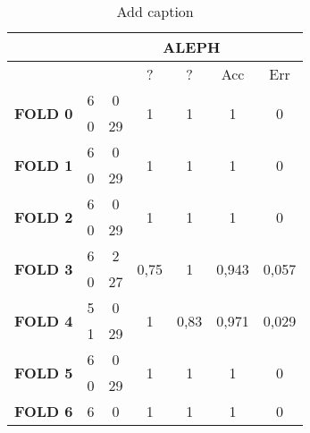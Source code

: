 \begin{table}[htbp]
  \centering
  \caption{Add caption}
    \begin{tabular}{rcccccc}
    \toprule
          & \multicolumn{6}{c}{\textbf{ALEPH}} \\
    \midrule
          &       &       & ?     & ?     & Acc   & Err \\
    \multicolumn{1}{c}{\multirow{2}[2]{*}{\textbf{FOLD 0}}} & 6     & 0     & \multirow{2}[2]{*}{1} & \multirow{2}[2]{*}{1} & \multirow{2}[2]{*}{1} & \multirow{2}[2]{*}{0} \\
    \multicolumn{1}{c}{} & 0     & 29    &       &       &       &  \\
    \multicolumn{1}{c}{\multirow{2}[1]{*}{\textbf{FOLD 1}}} & 6     & 0     & \multirow{2}[1]{*}{1} & \multirow{2}[1]{*}{1} & \multirow{2}[1]{*}{1} & \multirow{2}[1]{*}{0} \\
    \multicolumn{1}{c}{} & 0     & 29    &       &       &       &  \\
    \multicolumn{1}{c}{\multirow{2}[0]{*}{\textbf{FOLD 2}}} & 6     & 0     & \multirow{2}[0]{*}{1} & \multirow{2}[0]{*}{1} & \multirow{2}[0]{*}{1} & \multirow{2}[0]{*}{0} \\
    \multicolumn{1}{c}{} & 0     & 29    &       &       &       &  \\
    \multicolumn{1}{c}{\multirow{2}[1]{*}{\textbf{FOLD 3}}} & 6     & 2     & \multirow{2}[1]{*}{0,75} & \multirow{2}[1]{*}{1} & \multirow{2}[1]{*}{0,943} & \multirow{2}[1]{*}{0,057} \\
    \multicolumn{1}{c}{} & 0     & 27    &       &       &       &  \\
    \multicolumn{1}{c}{\multirow{2}[2]{*}{\textbf{FOLD 4}}} & 5     & 0     & \multirow{2}[2]{*}{1} & \multirow{2}[2]{*}{0,83} & \multirow{2}[2]{*}{0,971} & \multirow{2}[2]{*}{0,029} \\
    \multicolumn{1}{c}{} & 1     & 29    &       &       &       &  \\
    \multicolumn{1}{c}{\multirow{2}[1]{*}{\textbf{FOLD 5}}} & 6     & 0     & \multirow{2}[1]{*}{1} & \multirow{2}[1]{*}{1} & \multirow{2}[1]{*}{1} & \multirow{2}[1]{*}{0} \\
    \multicolumn{1}{c}{} & 0     & 29    &       &       &       &  \\
    \multicolumn{1}{c}{\multirow{2}[0]{*}{\textbf{FOLD 6}}} & 6     & 0     & \multirow{2}[0]{*}{1} & \multirow{2}[0]{*}{1} & \multirow{2}[0]{*}{1} & \multirow{2}[0]{*}{0} \\

\end{tabular}
\end{table}
